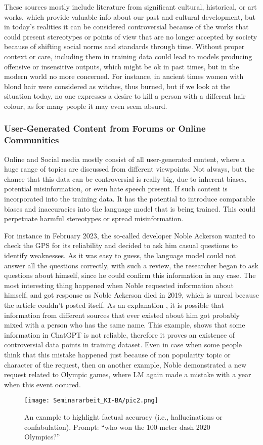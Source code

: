 These sources mostly include literature from significant cultural, historical, or art works, which provide valuable info about our past and cultural development, but in today's realities it can be considered controversial because of the works that could present stereotypes or points of view that are no longer accepted by society because of shifting social norms and standards through time. Without proper context or care, including them in training data could lead to models producing offensive or insensitive outputs, which might be ok in past times, but in the modern world no more concerned. For instance, in ancient times women with blond hair were considered as witches, thus burned, but if we look at the situation today, no one expresses a desire to kill a person with a different hair colour, as for many people it may even seem absurd.


\subsubsection{User-Generated Content from Forums or Online Communities}

Online and Social media mostly consist of all user-generated content, where a huge range of topics are discussed from different viewpoints. Not always, but the chance that this data can be controversial is really big, due to inherent biases, potential misinformation, or even hate speech present. If such content is incorporated into the training data. It has the potential to introduce comparable biases and inaccuracies into the language model that is being trained. This could perpetuate harmful stereotypes or spread misinformation.

For instance in February 2023, the so-called developer Noble Ackerson wanted to check the GPS for its reliability and decided to ask him casual questions to identify weaknesses\cite{na2023}. As it was easy to guess, the language model could not answer all the questions correctly, with such a review, the researcher began to ask questions about himself, since he could confirm this information in any case. The most interesting thing happened when Noble requested information about himself, and got response as Noble Ackerson died in 2019, which is unreal because the article couldn't posted itself. As an explanation , it is possible that information from different sources that ever existed about him got probably mixed with a person who has the same name. This example, shows that some information in ChatGPT is not reliable, therefore it proves an existence of controversial data points in training dataset. Even in case when some people think that this mistake happened just because of non popularity topic or character of the request, then on another example, Noble demonstrated a new request related to Olympic games, where LM again made a mistake with a year when this event occured. 

\begin{figure}
\centering
\texttt{[image: Seminararbeit\_KI-BA/pic2.png]}
\caption{\label{fig:frog}An example to highlight factual accuracy (i.e., hallucinations or confabulation). Prompt: “who won the 100-meter dash 2020 Olympics?”}
\end{figure}